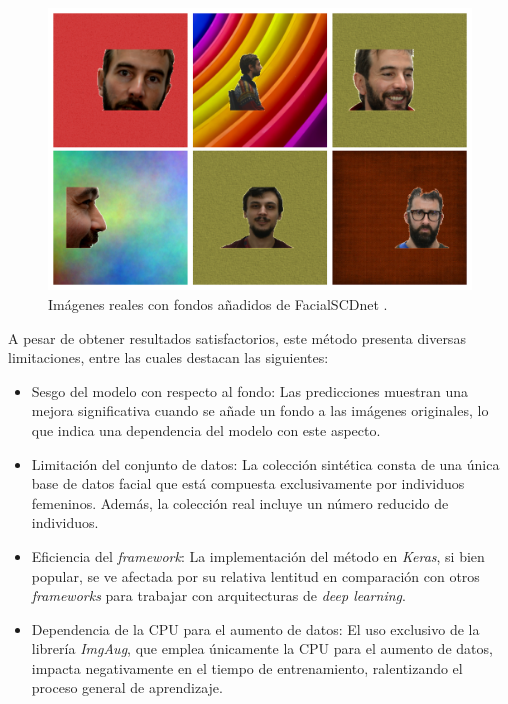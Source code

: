 \begin{figure}[h]
	\centering
	\includegraphics[scale=0.3]{imagenes/cap4/figura_FSCDnet.png}
	\caption[Ejemplos de imágenes reales con fondos FacialSCDnet.]{Imágenes reales con fondos añadidos de FacialSCDnet \cite{14}.}
	\label{fig24.2}
\end{figure}

A pesar de obtener resultados satisfactorios, este método presenta diversas limitaciones, entre las cuales destacan las siguientes: 

\begin{itemize}
	\item Sesgo del modelo con respecto al fondo: Las predicciones muestran una mejora significativa cuando se añade un fondo a las imágenes originales, lo que indica una dependencia del modelo con este aspecto.
	\item Limitación del conjunto de datos: La colección sintética consta de una única base de datos facial que está compuesta exclusivamente por individuos femeninos. Además, la colección real incluye un número reducido de individuos.
	\item Eficiencia del \textit{framework}: La implementación del método en \textit{Keras}, si bien popular, se ve afectada por su relativa lentitud en comparación con otros \textit{frameworks} para trabajar con arquitecturas de \textit{deep learning}.
	\item Dependencia de la CPU para el aumento de datos: El uso exclusivo de la librería \textit{ImgAug}, que emplea únicamente la CPU para el aumento de datos, impacta negativamente en el tiempo de entrenamiento, ralentizando el proceso general de aprendizaje.
\end{itemize}

